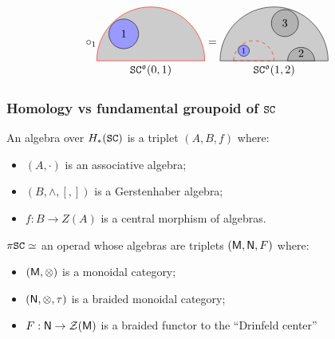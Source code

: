 \documentclass{beamer}
\begin{document}
\begin{frame}
\begin{equation*}
    \circ_{1}
    \begin{tikzpicture}[scale=0.85, baseline=5mm]
      \fill[fill=gray!40] (-2,0) -- (2,0) arc (0:180:2);
      \draw[red] (-2,0) -- (2,0) arc (0:180:2);
      \filldraw[fill=blue!40] (-1,1) circle (0.55) node{$1$};
      \draw (0,0) node[below] {$\SC^{\col o}(0,1)$};
    \end{tikzpicture}
    =
    \begin{tikzpicture}[scale=0.85, baseline=5mm]
      \filldraw[fill=gray!40] (-2,0) -- (2,0) arc (0:180:2);
      \begin{scope}[shift={(-.75,0)}, scale=0.375]
        \filldraw[fill=blue!40] (-1,1) circle (0.55) node{$\scriptstyle 1$};
      \end{scope}
      \draw[red,dashed] (-1.5,0) -- (0,0) arc (0:180:0.75);
      \filldraw[fill=gray!60] (0.5,0) -- (1.5,0) node[above,midway]{$2$} arc (0:180:0.5);
      \filldraw[fill=gray!60] (0.4,1.4) circle (0.5) node{$3$};
      \draw (0,0) node[below] {$\SC^{\col o}(1,2)$};
    \end{tikzpicture}
  \end{equation*}
\end{frame}

\begin{frame}
  \frametitle{Homology vs fundamental groupoid of $\mathtt{SC}$}
  \begin{theorem}
    An algebra over $H_{*}(\mathtt{SC})$ is a triplet $(A, B, f)$ where:
    \begin{itemize}
    \item $(A, \cdot)$ is an associative algebra;
    \item $(B, \wedge, [,])$ is a Gerstenhaber algebra;
    \item $f : B \to Z(A)$ is a central morphism of algebras.
    \end{itemize}
  \end{theorem}

  \pause
  \begin{theorem}
    $\pi\mathtt{SC} \simeq$ an operad whose algebras are triplets $(\mathsf{M}, \mathsf{N}, F)$ where:
    \begin{itemize}
    \item $(\mathsf{M}, \otimes)$ is a monoidal category;
    \item $(\mathsf{N}, \otimes, \tau)$ is a braided monoidal category;
    \item $F : \mathsf{N} \to \mathcal{Z}(\mathsf{M})$ is a braided functor to the ``Drinfeld center''
    \end{itemize}
  \end{theorem}
\end{frame}
\end{document}
